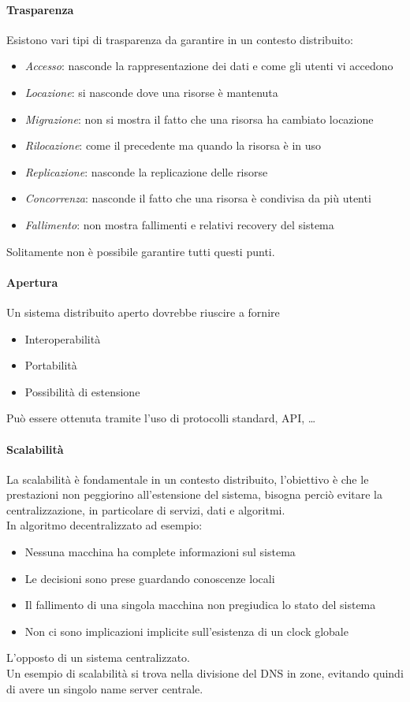 \paragraph{Trasparenza}
Esistono vari tipi di trasparenza da garantire in un contesto distribuito:
\begin{itemize}
    \item \emph{Accesso}: nasconde la rappresentazione dei dati 
    e come gli utenti vi accedono
    \item \emph{Locazione}: si nasconde dove una risorse è mantenuta
    \item \emph{Migrazione}: non si mostra il fatto che una risorsa ha cambiato 
    locazione
    \item \emph{Rilocazione}: come il precedente ma quando la risorsa è in uso
    \item \emph{Replicazione}: nasconde la replicazione delle risorse
    \item \emph{Concorrenza}: nasconde il fatto che una risorsa è condivisa
    da più utenti
    \item \emph{Fallimento}: non mostra fallimenti e relativi recovery del sistema
\end{itemize}
Solitamente non è possibile garantire tutti questi punti.

\paragraph{Apertura}
Un sistema distribuito aperto dovrebbe riuscire a fornire
\begin{itemize}
    \item Interoperabilità
    \item Portabilità
    \item Possibilità di estensione
\end{itemize}
Può essere ottenuta tramite l'uso di protocolli standard, API, \dots

\paragraph{Scalabilità}
La scalabilità è fondamentale in un contesto distribuito, 
l'obiettivo è che le prestazioni non peggiorino all'estensione
del sistema, bisogna perciò evitare la centralizzazione, 
in particolare di servizi, dati e algoritmi.\\
In algoritmo decentralizzato ad esempio:
\begin{itemize}
    \item Nessuna macchina ha complete informazioni sul sistema
    \item Le decisioni sono prese guardando conoscenze locali
    \item Il fallimento di una singola macchina non pregiudica lo stato
    del sistema
    \item Non ci sono implicazioni implicite sull'esistenza di un clock globale
\end{itemize}
L'opposto di un sistema centralizzato.\\
Un esempio di scalabilità si trova nella divisione del DNS in zone, 
evitando quindi di avere un singolo name server centrale.

